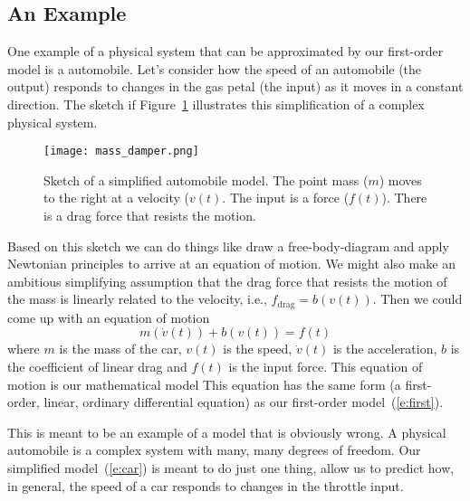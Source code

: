 \subsection{An Example}
One example of a physical system that can be approximated by our first-order model is a automobile.  Let's consider how the speed of an automobile (the output) responds to changes in the gas petal (the input) as it moves in a constant direction.  The sketch if Figure~\ref{f:massd} illustrates this simplification of a complex physical system. 
\begin{figure}[hbt!]
\centering
\texttt{[image: mass\_damper.png]}
\caption{Sketch of a simplified automobile model.  The point mass ($m$) moves to the right at a velocity ($v(t)$.  The input is a force ($f(t)$).  There is a drag force that resists the motion. }
\label{f:massd}
\end{figure}
Based on this sketch we can do things like draw a free-body-diagram and apply Newtonian principles to arrive at an equation of motion.  We might also make an ambitious simplifying assumption that the drag force that resists the motion of the mass is linearly related to the velocity, i.e., $f_{\mathrm{drag}}=b(v(t))$.  Then we could come up with an equation of motion
\begin{equation}
\label{e:car}
m\left(\dot{v}(t)\right) + b(v(t)) = f(t)
\end{equation}
where $m$ is the mass of the car, $v(t)$ is the speed, $\dot{v}(t)$ is the acceleration, $b$ is the coefficient of linear drag and $f(t)$ is the input force.  This equation of motion is our mathematical model
This equation has the same form (a first-order, linear, ordinary differential equation) as our first-order model~(\ref{e:first}).

This is meant to be an example of a model that is obviously wrong.  A physical automobile is a complex system with many, many degrees of freedom.  Our simplified model~(\ref{e:car}) is meant to do just one thing, allow us to predict how, in general, the speed of a car responds to changes in the throttle input.


